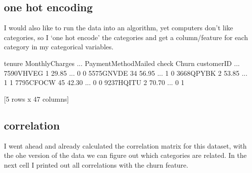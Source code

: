 \documentclass[letterpaper,10pt,english]{jupyterBook}
\begin{document}
\subsection{one hot encoding}
\label{\detokenize{c7_case_studies/Churn:one-hot-encoding}}
\sphinxAtStartPar
I would also like to run the data into an algorithm, yet computers don’t like categories, so I ‘one hot encode’ the categories and get a column/feature for each category in my categorical variables.

\begin{sphinxVerbatim}[commandchars=\\\{\}]
  
    \PYG{p}{[}
     \PYG{p}{[}\PYG{p}{]}
    \PYG{p}{]} 
\end{sphinxVerbatim}

\begin{sphinxVerbatim}[commandchars=\\\{\}]
            tenure  MonthlyCharges  ...  PaymentMethod\PYGZus{}Mailed check  Churn
customerID                          ...                                   
7590\PYGZhy{}VHVEG       1           29.85  ...                           0      0
5575\PYGZhy{}GNVDE      34           56.95  ...                           1      0
3668\PYGZhy{}QPYBK       2           53.85  ...                           1      1
7795\PYGZhy{}CFOCW      45           42.30  ...                           0      0
9237\PYGZhy{}HQITU       2           70.70  ...                           0      1

[5 rows x 47 columns]
\end{sphinxVerbatim}


\subsection{correlation}
\label{\detokenize{c7_case_studies/Churn:correlation}}
\sphinxAtStartPar
I went ahead and already calculated the correlation matrix for this dataset, with the ohe version of the data we can figure out which categories are related.
In the next cell I printed out all correlations with the churn feature.
\end{document}
